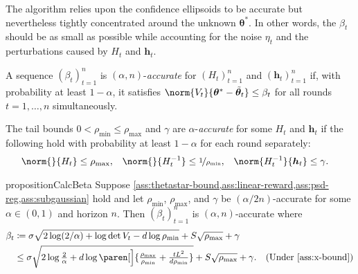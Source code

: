 \documentclass{article}
\renewcommand{\vec}[1]{\bm{#1}}
\newcommand{\defeq}{\coloneq}
\newcommand{\inv}[1]{#1^{-1}}
\renewcommand{\det}{\operatorname{det}}
\DeclarePairedDelimiter{\paren}()
\begin{document}
The algorithm relies upon the confidence ellipsoids to be accurate but
nevertheless tightly concentrated around the unknown $\vec\theta^*$.
In other words, the $\beta_t$ should be as small as possible while
accounting for the noise $\eta_t$ and the perturbations caused by
$H_t$ and $\vec h_t$.

\begin{definition}\label{def:accurate-beta}
  A sequence $(\beta_t)_{t=1}^n$ is $(\alpha, n)$-\emph{accurate} for
  $(H_t)_{t=1}^n$ and $(\vec h_t)_{t=1}^n$ if, with probability at
  least $1-\alpha$, it satisfies
  $\norm{V_t}{\vec\theta^* - \tilde{\vec\theta}_t} \le \beta_t$
  for all rounds $t=1,\dotsc,n$ simultaneously.
\end{definition}

\begin{definition}\label{def:accurate-params}
  The tail bounds $0 < \rho_{\min} \le \rho_{\max}$ and $\gamma$ are
  $\alpha$-\emph{accurate} for some $H_t$ and $\vec h_t$ if the
  following hold with probability at least $1-\alpha$ for each round
  separately:
  \begin{align*}
    \norm{}{H_t} &\le \rho_{\max},
    &\norm{}{\inv{H_t}} &\le \nicefrac{1}{\rho_{\min}},
    &\norm{\inv{H_t}}{\vec h_t} &\le \gamma.
  \end{align*}
\end{definition}

\begin{restatable}{proposition}{CalcBeta}%
  \label{prop:calc-beta}
  Suppose
  \cref{ass:thetastar-bound,ass:linear-reward,ass:psd-reg,ass:subgaussian}
  hold and let $\rho_{\min}$, $\rho_{\max}$, and $\gamma$ be
  $(\alpha/2n)$-accurate for some $\alpha\in(0,1)$ and horizon $n$.
  Then $(\beta_t)_{t=1}^n$ is $(\alpha,n)$-accurate where
  \begin{align*}
    \beta_t
    &\defeq \sigma\sqrt{2\log(2/\alpha) + \log\det V_t - d\log\rho_{\min}}
      + S\sqrt{\rho_{\max}} + \gamma \\
    &\le \sigma\sqrt{2\log\tfrac{2}{\alpha} + d\log\paren[\Big]{\tfrac{\rho_{\max}}{\rho_{\min}}
      + \tfrac{tL^2}{d\rho_{\min}}}}
      + S\sqrt{\rho_{\max}} + \gamma.
    &\text{(Under \cref{ass:x-bound})}
  \end{align*}
\end{restatable}

\vspace{-5pt}
\end{document}
